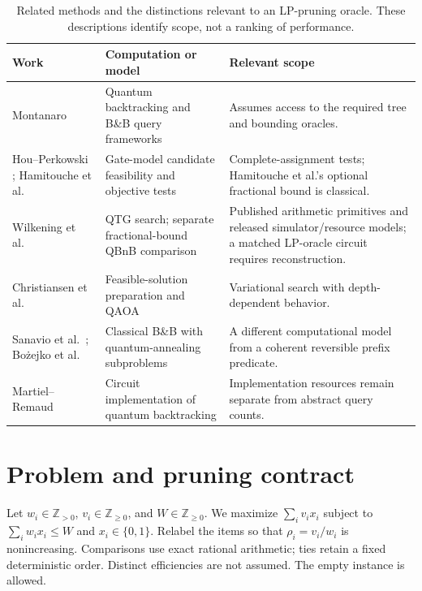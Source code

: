 \documentclass[referee,pdflatex,sn-mathphys-num]{sn-jnl}
\theoremstyle{thmstyleone}
\theoremstyle{thmstyletwo}
\begin{document}
\begin{table}[t]
\caption{Related methods and the distinctions relevant to an LP-pruning oracle. These descriptions identify scope, not a ranking of performance.}
\label{tab:related}
\centering
\small
\setlength{\tabcolsep}{5pt}
\begin{tabular}{>{\raggedright\arraybackslash}p{}>{\raggedright\arraybackslash}p{}>{\raggedright\arraybackslash}p{}}
\toprule
\textbf{Work} & \textbf{Computation or model} & \textbf{Relevant scope} \\
\midrule
Montanaro \cite{ref35,ref24} & Quantum backtracking and B\&B query frameworks & Assumes access to the required tree and bounding oracles. \\
Hou--Perkowski \cite{hou2020}; Hamitouche et al.\ \cite{hamitouche2025} & Gate-model candidate feasibility and objective tests & Complete-assignment tests; Hamitouche et al.'s optional fractional bound is classical. \\
Wilkening et al.\ \cite{wilkening2025,wilkening2025code} & QTG search; separate fractional-bound QBnB comparison & Published arithmetic primitives and released simulator/resource models; a matched LP-oracle circuit requires reconstruction. \\
Christiansen et al.\ \cite{ref23} & Feasible-solution preparation and QAOA & Variational search with depth-dependent behavior. \\
Sanavio et al.\ \cite{ref36}; Bo\.{z}ejko et al.\ \cite{bozejko2026} & Classical B\&B with quantum-annealing subproblems & A different computational model from a coherent reversible prefix predicate. \\
Martiel--Remaud \cite{martiel2019} & Circuit implementation of quantum backtracking & Implementation resources remain separate from abstract query counts. \\
\bottomrule
\end{tabular}
\end{table}



\section{Problem and pruning contract}\label{sec:model}
Let $w_i\in\mathbb Z_{>0}$, $v_i\in\mathbb Z_{\geq0}$, and $W\in\mathbb Z_{\geq0}$. We maximize $\sum_i v_i x_i$ subject to $\sum_i w_i x_i\leq W$ and $x_i\in\{0,1\}$. Relabel the items so that $\rho_i=v_i/w_i$ is nonincreasing. Comparisons use exact rational arithmetic; ties retain a fixed deterministic order. Distinct efficiencies are not assumed. The empty instance is allowed.
\end{document}
